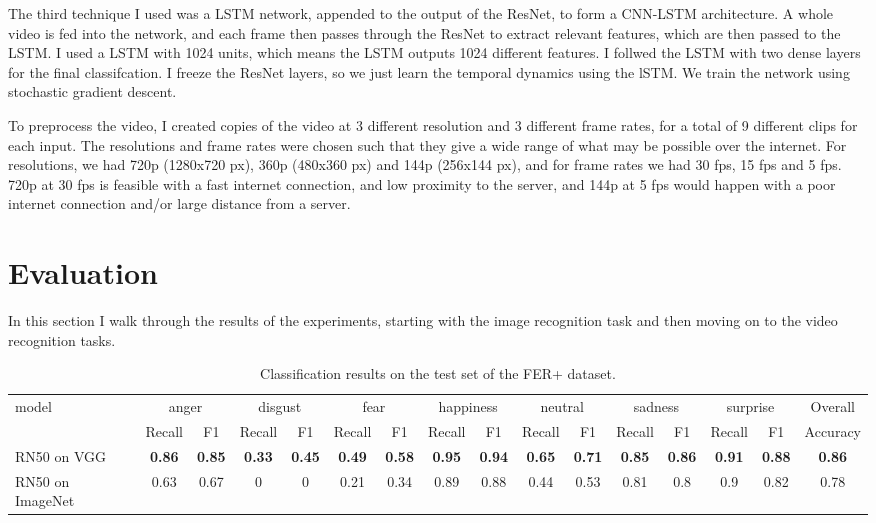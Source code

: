\documentclass[sigconf]{acmart}
\begin{document}
{The third technique I used was a LSTM network, appended to the output of the
ResNet, to form a CNN-LSTM architecture. 
A whole video is fed into the network, and each frame then passes through the
ResNet to extract relevant features, which are then passed to the LSTM.
I used a LSTM with 1024 units, which
means the LSTM outputs 1024 different features. I follwed the LSTM with two
dense layers for the final classifcation.
I freeze the ResNet layers, so we just learn the temporal dynamics using the
lSTM. We train the network using stochastic gradient descent.

To preprocess the video, I created copies of the video at 3 different
resolution and 3 different frame rates, for a total of 9 different clips for
each input. The resolutions and frame rates were chosen such that they give a
wide range of what may be possible over the internet. For resolutions, we had
720p (1280x720 px), 360p (480x360 px) and 144p (256x144 px), and for
frame rates we had 30 fps, 15 fps and 5 fps. 720p at 30 fps is feasible
with a fast internet connection, and low proximity to the server, and 144p at
5 fps would happen with a poor internet connection and/or large distance from
a server. 

\section{Evaluation}

In this section I walk through the results of the experiments, starting with
the image recognition task and then moving on to the video recognition tasks.

\begin{table}[htbp]
\caption{Classification results on the test set of the FER+ dataset.}
\label{tab:imageres}
\begin{tabular}{lccccccccccccccc}
\multirow{2}{*}{model} & \multicolumn{2}{c}{anger} &
\multicolumn{2}{c}{disgust} & \multicolumn{2}{c}{fear} &
\multicolumn{2}{c}{happiness} & \multicolumn{2}{c}{neutral} &
\multicolumn{2}{c}{sadness} & \multicolumn{2}{c}{surprise}  & Overall\\ \cline{2-16}
                       & Recall        & F1        
		       & Recall        & F1        & Recall        & F1
		       &  Recall        & F1        &  Recall        & F1
		       & Recall        & F1        & Recall        & F1    &
		       Accuracy    \\ \hline
RN50 on VGG & \textbf{0.86} &\textbf{0.85} &\textbf{0.33} &\textbf{0.45} &\textbf{0.49} &\textbf{0.58} &\textbf{0.95} &\textbf{0.94} &\textbf{0.65} &\textbf{0.71} &\textbf{0.85} &\textbf{0.86} &\textbf{0.91} &\textbf{0.88} &\textbf{0.86} \\
RN50 on ImageNet   & 0.63 &0.67 &0 &0 &0.21 &0.34 &0.89 &0.88 &0.44 &0.53 &0.81 &0.8 &0.9 &0.82 &0.78 \\
\end{tabular}
\end{table}

}
\end{document}
